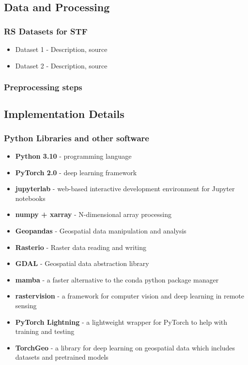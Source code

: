 \begin{multicols}{2}

\subsection{Data and Processing}
\subsubsection{RS Datasets for STF}
    \begin{itemize}
        \item Dataset 1 - Description, source
        \item Dataset 2 - Description, source
    \end{itemize}
\subsubsection{Preprocessing steps}
    

\subsection{Implementation Details}
\subsubsection{Python Libraries and other software}
\begin{itemize}
    \item \textbf{Python 3.10} - programming language
    \item \textbf{PyTorch 2.0} - deep learning framework
    \item \textbf{jupyterlab} - web-based interactive development environment for Jupyter notebooks
    \item \textbf{numpy + xarray} - N-dimensional array processing
    \item \textbf{Geopandas} - Geospatial data manipulation and analysis
    \item \textbf{Rasterio} - Raster data reading and writing
    \item \textbf{GDAL} - Geospatial data abstraction library
    \item \textbf{mamba} - a faster alternative to the conda python package manager
    \item \textbf{rastervision} - a framework for computer vision and deep learning in remote sensing
    \item \textbf{PyTorch Lightning} - a lightweight wrapper for PyTorch to help with training and testing
    \item \textbf{TorchGeo} - a library for deep learning on geospatial data which includes datasets and pretrained models
\end{itemize}


\end{multicols}
